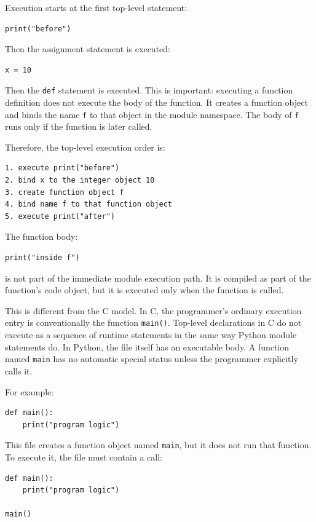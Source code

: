 \documentclass[a4paper,twoside]{report}
\begin{document}
Execution starts at the first top-level statement:

\begin{verbatim}
print("before")
\end{verbatim}

Then the assignment statement is executed:

\begin{verbatim}
x = 10
\end{verbatim}

Then the \texttt{def} statement is executed. This is important: executing a function definition does not execute the body of the function. It creates a function object and binds the name \texttt{f} to that object in the module namespace. The body of \texttt{f} runs only if the function is later called.

Therefore, the top-level execution order is:

\begin{verbatim}
1. execute print("before")
2. bind x to the integer object 10
3. create function object f
4. bind name f to that function object
5. execute print("after")
\end{verbatim}

The function body:

\begin{verbatim}
print("inside f")
\end{verbatim}

is not part of the immediate module execution path. It is compiled as part of the function's code object, but it is executed only when the function is called.

This is different from the C model. In C, the programmer's ordinary execution entry is conventionally the function \texttt{main()}. Top-level declarations in C do not execute as a sequence of runtime statements in the same way Python module statements do. In Python, the file itself has an executable body. A function named \texttt{main} has no automatic special status unless the programmer explicitly calls it.

For example:

\begin{verbatim}
def main():
    print("program logic")
\end{verbatim}

This file creates a function object named \texttt{main}, but it does not run that function. To execute it, the file must contain a call:

\begin{verbatim}
def main():
    print("program logic")

main()
\end{verbatim}
\end{document}
